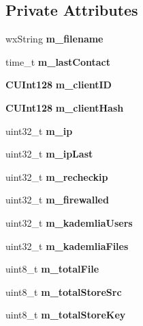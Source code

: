 \subsection*{Private Attributes}
\begin{DoxyCompactItemize}
\item 
wxString {\bfseries m\_\-filename}\label{classKademlia_1_1CPrefs_af24457c90d83887d54a1d041f55896a0}

\item 
time\_\-t {\bfseries m\_\-lastContact}\label{classKademlia_1_1CPrefs_a2f12e09b0588844c3e018a39f72c9861}

\item 
{\bf CUInt128} {\bfseries m\_\-clientID}\label{classKademlia_1_1CPrefs_a007db5698ef4186edabb420bc98fbc10}

\item 
{\bf CUInt128} {\bfseries m\_\-clientHash}\label{classKademlia_1_1CPrefs_a0f0d1cca3f0610dc21a56a5075435427}

\item 
uint32\_\-t {\bfseries m\_\-ip}\label{classKademlia_1_1CPrefs_aad021d760aef453b564b7cbff6bfd12d}

\item 
uint32\_\-t {\bfseries m\_\-ipLast}\label{classKademlia_1_1CPrefs_a3ebc044b1ac657503a9f890a75e005a2}

\item 
uint32\_\-t {\bfseries m\_\-recheckip}\label{classKademlia_1_1CPrefs_adeda7712db43c4d786377b96fbd8f733}

\item 
uint32\_\-t {\bfseries m\_\-firewalled}\label{classKademlia_1_1CPrefs_a22ebc2d8faf3ae336c4c60f2464ef9dc}

\item 
uint32\_\-t {\bfseries m\_\-kademliaUsers}\label{classKademlia_1_1CPrefs_af159fa4b322eb0c378ca6d58dce7cf6b}

\item 
uint32\_\-t {\bfseries m\_\-kademliaFiles}\label{classKademlia_1_1CPrefs_a61cab04384fdb2092e63063393439b99}

\item 
uint8\_\-t {\bfseries m\_\-totalFile}\label{classKademlia_1_1CPrefs_ae305a7c2bd50a7b8871535bb898cb2d0}

\item 
uint8\_\-t {\bfseries m\_\-totalStoreSrc}\label{classKademlia_1_1CPrefs_a0a9550ed6d989ce6eac1717189f7243a}

\item 
uint8\_\-t {\bfseries m\_\-totalStoreKey}\label{classKademlia_1_1CPrefs_a5c4de9a70d47e14418a7ef5c54791dd6}


\end{DoxyCompactItemize}
